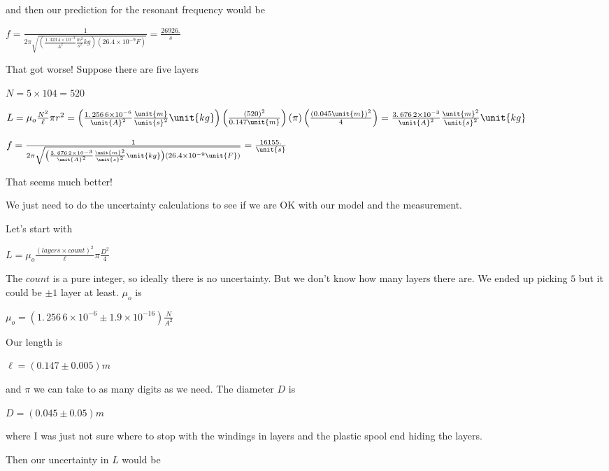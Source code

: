 \documentclass{sebase}
\begin{document}
and then our prediction for the resonant frequency would be

$f=\frac{1}{2\pi \sqrt{\left( \allowbreak \frac{1.\,\allowbreak 323\,4\times
10^{-3}}{\unit{A}^{2}}\frac{\unit{m}^{2}}{\unit{s}^{2}}\unit{kg}\right)
\left( 26.4\times 10^{-9}\unit{F}\right) }}=\allowbreak \frac{26926.}{\unit{s%
}}$

That got worse! Suppose there are five layers

$N=5\times 104=\allowbreak 520$

$L=\mu _{o}\frac{N^{2}}{\ell }\pi r^{2}=\left( \allowbreak \frac{%
1.\,\allowbreak 256\,6\times 10^{-6}}{\unit{A}^{2}}\frac{\unit{m}}{\unit{s}%
^{2}}\unit{kg}\right) \left( \frac{\left( \allowbreak 520\right) ^{2}}{0.147%
\unit{m}}\right) \left( \pi \right) \left( \frac{\left( 0.045\unit{m}\right)
^{2}}{4}\right) =\allowbreak \frac{3.\,\allowbreak 676\,2\times 10^{-3}}{%
\unit{A}^{2}}\frac{\unit{m}^{2}}{\unit{s}^{2}}\unit{kg}$

$f=\frac{1}{2\pi \sqrt{\left( \frac{3.\,\allowbreak 676\,2\times 10^{-3}}{%
\unit{A}^{2}}\frac{\unit{m}^{2}}{\unit{s}^{2}}\unit{kg}\right) \left(
26.4\times 10^{-9}\unit{F}\right) }}=\allowbreak \frac{16155.}{\unit{s}}$

That seems much better!

We just need to do the uncertainty calculations to see if we are OK with our
model and the measurement.

\bigskip Let's start with 

\bigskip $L=\mu _{o}\frac{\left( layers\times count\right) ^{2}}{\ell }\pi 
\frac{D^{2}}{4}$

The $count$ is a pure integer, so ideally there is no uncertainty. But we
don't know how many layers there are. We ended up picking $5$ but it could
be $\pm 1$ layer at least. $\mu _{o}$ is 

$\mu _{o}=\left( 1.\,\allowbreak 256\,6\times 10^{-6}\pm 1.9\times
10^{-16}\right) \allowbreak \frac{\unit{N}}{\unit{A}^{2}}$

Our length is 

$\ell =\left( 0.147\pm 0.005\right) \unit{m}$

and $\pi $ we can take to as many digits as we need. The diameter $D$ is 

$D=\left( 0.045\pm 0.05\right) \unit{m}$ 

where I was just not sure where to stop with the windings in layers and the
plastic spool end hiding the layers.

Then our uncertainty in $L$ would be
\end{document}
